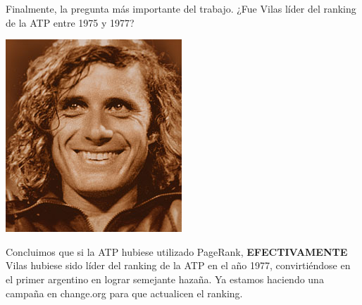 Finalmente, la pregunta más importante del trabajo. ¿Fue Vilas líder del ranking de la ATP entre 1975 y 1977?

\begin{center}
\includegraphics[scale=1]{images/vilas2.jpg}
\end{center}

Concluimos que si la ATP hubiese utilizado PageRank, \textbf{EFECTIVAMENTE} Vilas hubiese sido líder del ranking de la ATP en el año 1977, convirtiéndose en el primer argentino en lograr semejante hazaña. Ya estamos haciendo una campa\~na en change.org para que actualicen el ranking.